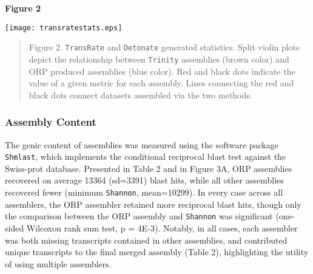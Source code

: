 \documentclass[10pt,letterpaper]{article}
\begin{document}
\newpage

\textbf{\hypertarget{Figure 2}{Figure 2}} \\
\centerline{\texttt{[image: transratestats.eps]}}
\begin{quote}
\small{Figure 2. \texttt{TransRate} and \texttt{Detonate} generated statistics. Split violin plots depict the relationship between \texttt{Trinity} assemblies (brown color) and ORP produced assemblies (blue color). Red and black dots indicate the value of a given metric for each assembly. Lines connecting the red and black dots connect datasets assembled via the two methods.}
\end{quote} 

\subsubsection{Assembly Content}

The genic content of assemblies was measured using the software package \texttt{Shmlast}, which implements the conditional reciprocal blast test against the Swiss-prot database. Presented in Table 2 and in Figure 3A, ORP assemblies recovered on average 13364 (sd=3391) blast hits, while all other assemblies recovered fewer (minimum \texttt{Shannon}, mean=10299). In every case across all assemblers, the ORP assembler retained more reciprocal blast hits, though only the comparison between the ORP assembly and \texttt{Shannon} was significant (one-sided Wilcoxon rank sum test, p = 4E-3). Notably, in all cases, each assembler was both missing transcripts contained in other assemblies, and contributed unique transcripts to the final merged assembly (Table 2), highlighting the utility of using multiple assemblers. \\
\end{document}
